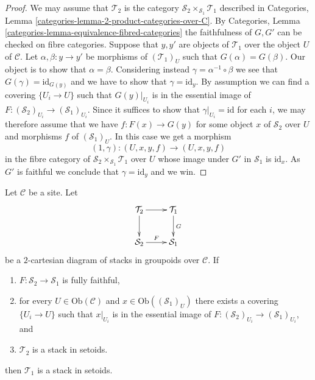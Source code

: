 \begin{proof}
We may assume that $\mathcal{T}_2$ is the category
$\mathcal{S}_2 \times_{\mathcal{S}_1} \mathcal{T}_1$
described in
Categories, Lemma \ref{categories-lemma-2-product-categories-over-C}.
By
Categories, Lemma \ref{categories-lemma-equivalence-fibred-categories}
the faithfulness of $G, G'$ can be checked on fibre categories.
Suppose that $y, y'$ are objects of $\mathcal{T}_1$ over the object $U$
of $\mathcal{C}$. Let $\alpha, \beta : y \to y'$ be morphisms of
$(\mathcal{T}_1)_U$ such that $G(\alpha) = G(\beta)$. Our object is to
show that $\alpha = \beta$. Considering instead
$\gamma = \alpha^{-1} \circ \beta$ we see that $G(\gamma) = \text{id}_{G(y)}$
and we have to show that $\gamma = \text{id}_y$. By assumption we
can find a covering $\{U_i \to U\}$ such that $G(y)|_{U_i}$ is in the
essential image of $F :(\mathcal{S}_2)_{U_i} \to (\mathcal{S}_1)_{U_i}$.
Since it suffices to show that $\gamma|_{U_i} = \text{id}$ for each $i$,
we may therefore assume that we have
$f : F(x) \to G(y)$ for some object $x$ of $\mathcal{S}_2$ over $U$
and morphisms $f$ of $(\mathcal{S}_1)_U$. In this case we get
a morphism
$$
(1, \gamma) : (U, x, y, f) \longrightarrow (U, x, y, f)
$$
in the fibre category of $\mathcal{S}_2 \times_{\mathcal{S}_1} \mathcal{T}_1$
over $U$ whose image under $G'$ in $\mathcal{S}_1$ is $\text{id}_x$.
As $G'$ is faithful we conclude that $\gamma = \text{id}_y$ and we win.
\end{proof}

\begin{lemma}
\label{lemma-stack-in-setoids-descent}
Let $\mathcal{C}$ be a site.
Let
$$
\xymatrix{
\mathcal{T}_2 \ar[r] \ar[d] & \mathcal{T}_1 \ar[d]^G \\
\mathcal{S}_2 \ar[r]^F & \mathcal{S}_1
}
$$
be a $2$-cartesian diagram of stacks in groupoids over $\mathcal{C}$.
If
\begin{enumerate}
\item $F : \mathcal{S}_2 \to \mathcal{S}_1$ is fully faithful,
\item for every $U \in \text{Ob}(\mathcal{C})$ and
$x \in \text{Ob}((\mathcal{S}_1)_U)$ there exists a covering
$\{U_i \to U\}$ such that $x|_{U_i}$ is in the essential
image of $F : (\mathcal{S}_2)_{U_i} \to (\mathcal{S}_1)_{U_i}$, and
\item $\mathcal{T}_2$ is a stack in setoids.
\end{enumerate}
then $\mathcal{T}_1$ is a stack in setoids.
\end{lemma}

